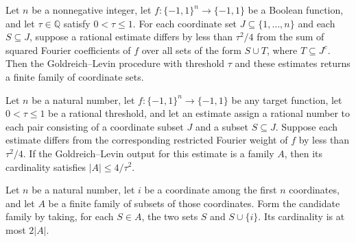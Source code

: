 \begin{theorem}
\label{FABL.goldreichLevinOutput_exists_of_accurate}
\leanok
{}
Let $n$ be a nonnegative integer, let $f:\{-1,1\}^n\to\{-1,1\}$ be a Boolean function,
and let $\tau\in\mathbb{Q}$ satisfy $0<\tau\le 1$. For each coordinate set
$J\subseteq\{1,\ldots,n\}$ and each $S\subseteq J$, suppose a rational estimate differs
by less than $\tau^2/4$ from the sum of squared Fourier coefficients of $f$ over all
sets of the form $S\cup T$, where $T\subseteq J^c$. Then the Goldreich–Levin procedure
with threshold $\tau$ and these estimates returns a finite family of coordinate sets.
\end{theorem}

\begin{theorem}
\label{FABL.goldreichLevinOutput_card_le}
\leanok
{}
Let $n$ be a natural number, let $f:\{−1,1\}^n\to\{−1,1\}$ be any target function, let
$0<\tau\le1$ be a rational threshold, and let an estimate assign a rational number to
each pair consisting of a coordinate subset $J$ and a subset $S\subseteq J$. Suppose
each estimate differs from the corresponding restricted Fourier weight of $f$ by less
than $\tau^2/4$. If the Goldreich–Levin output for this estimate is a family $A$, then
its cardinality satisfies $|A|\le4/\tau^2$.
\end{theorem}

\begin{theorem}
\label{FABL.card_goldreichLevinCandidates_le_two_mul}
\leanok
{}
Let $n$ be a natural number, let $i$ be a coordinate among the first $n$ coordinates,
and let $A$ be a finite family of subsets of those coordinates. Form the candidate
family by taking, for each $S\in A$, the two sets $S$ and $S\cup\{i\}$. Its cardinality
is at most $2|A|$.
\end{theorem}

